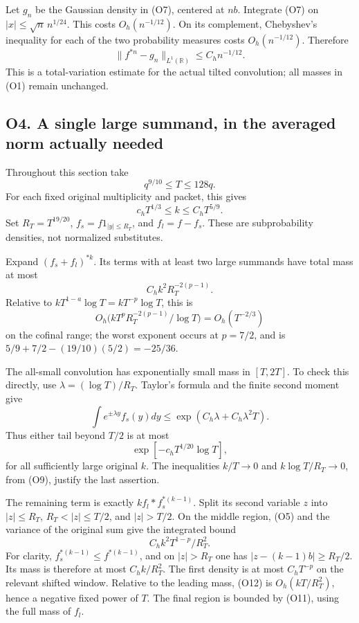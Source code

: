 Let \(g_n\) be the Gaussian density in (O7), centered at \(nb\).
Integrate (O7) on \(|x|\le\sqrt n\,n^{1/24}\). This costs
\(O_h(n^{-1/12})\). On its complement, Chebyshev's inequality for each
of the two probability measures costs \(O_h(n^{-1/12})\). Therefore \[
\boxed{\|f^{*n}-g_n\|_{L^1(\mathbb R)}\le C_h n^{-1/12}.}\tag{O8}
\] This is a total-variation estimate for the actual tilted convolution;
all masses in (O1) remain unchanged.

\subsection{O4. A single large summand, in the averaged norm actually
needed}\label{sa:o4.-a-single-large-summand-in-the-averaged-norm-actually-needed}

Throughout this section take \[
q^{9/10}\le T\le128q.
\] For each fixed original multiplicity and packet, this gives \[
c_hT^{1/3}\le k\le C_hT^{5/9}.\tag{O9}
\] Set \(R_T=T^{19/20}\), \(f_s=f1_{|y|\le R_T}\), and \(f_l=f-f_s\).
These are subprobability densities, not normalized substitutes.

Expand \((f_s+f_l)^{*k}\). Its terms with at least two large summands
have total mass at most \[
C_h k^2R_T^{-2(p-1)}.\tag{O10}
\] Relative to \(kT^{1-a}\log T=kT^{-p}\log T\), this is \[
O_h\bigl(kT^pR_T^{-2(p-1)}/\log T\bigr)=O_h(T^{-2/3})
\] on the cofinal range; the worst exponent occurs at \(p=7/2\), and is
\(5/9+7/2-(19/10)(5/2)=-25/36\).

The all-small convolution has exponentially small mass in \([T,2T]\). To
check this directly, use \(\lambda=(\log T)/R_T\). Taylor's formula and
the finite second moment give \[
\int e^{\pm\lambda y}f_s(y)dy
\le\exp(C_h\lambda+C_h\lambda^2T).
\] Thus either tail beyond \(T/2\) is at most \[
\exp[-c_hT^{1/20}\log T],\tag{O11}
\] for all sufficiently large original \(k\). The inequalities
\(k/T\to0\) and \(k\log T/R_T\to0\), from (O9), justify the last
assertion.

The remaining term is exactly \(k f_l*f_s^{*(k-1)}\). Split its second
variable \(z\) into \(|z|\le R_T\), \(R_T<|z|\le T/2\), and \(|z|>T/2\).
On the middle region, (O5) and the variance of the original sum give the
integrated bound \[
C_h k^2T^{1-p}/R_T^2.\tag{O12}
\] For clarity, \(f_s^{*(k-1)}\le f^{*(k-1)}\), and on \(|z|>R_T\) one
has \(|z-(k-1)b|\ge R_T/2\). Its mass is therefore at most
\(C_h k/R_T^2\). The first density is at most \(C_hT^{-p}\) on the
relevant shifted window. Relative to the leading mass, (O12) is
\(O_h(kT/R_T^2)\), hence a negative fixed power of \(T\). The final
region is bounded by (O11), using the full mass of \(f_l\).

